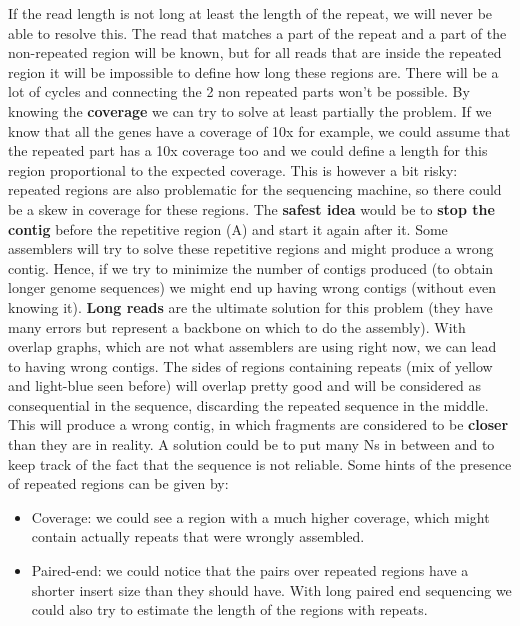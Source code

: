 If the read length is not long at least the length of the repeat, we will never be able to resolve this. The read that matches a part of the repeat and a part of the non-repeated region will be known, but for all reads that are inside the repeated region it will be impossible to define how long these regions are. There will be a lot of cycles and connecting the 2 non repeated parts won't be possible.
By knowing the \textbf{coverage} we can try to solve at least partially the problem. If we know that all the genes have a coverage of 10x for example, we could assume that the repeated part has a 10x coverage too and we could define a length for this region proportional to the expected coverage.
This is however a bit risky: repeated regions are also problematic for the sequencing machine, so there could be a skew in coverage for these regions.
The \textbf{safest idea} would be to \textbf{stop the contig} before the repetitive region (A) and start it again after it. Some assemblers will try to solve these repetitive regions and might produce a wrong contig. Hence, if we try to minimize the number of contigs produced (to obtain longer genome sequences) we might end up having wrong contigs (without even knowing it).
\textbf{Long reads} are the ultimate solution for this problem (they have many errors but represent a backbone on which to do the assembly).
With overlap graphs, which are not what assemblers are using right now, we can lead to having wrong contigs. The sides of regions containing repeats (mix of yellow and light-blue seen before) will overlap pretty good and will be considered as consequential in the sequence, discarding the repeated sequence in the middle. This will produce a wrong contig, in which fragments are considered to be \textbf{closer} than they are in reality. A solution could be to put many Ns in between and to keep track of the fact that the sequence is not reliable.
Some hints of the presence of repeated regions can be given by:

\begin{itemize}
    \item Coverage: we could see a region with a much higher coverage, which might contain actually repeats that were wrongly assembled.
    \item Paired-end: we could notice that the pairs over repeated regions have a shorter insert size than they should have. With long paired end sequencing we could also try to estimate the length of the regions with repeats.
\end{itemize}

